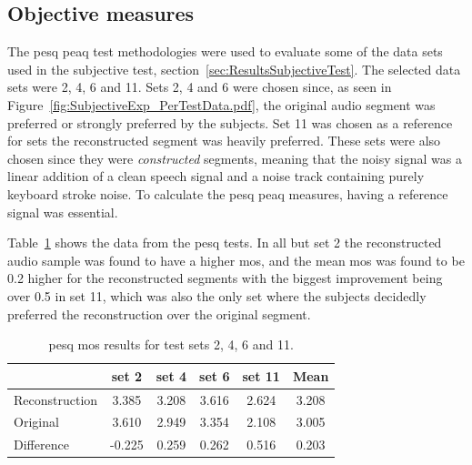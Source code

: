 \subsection{Objective measures}
The \DIFdelbegin {}\DIFdelend \DIFaddbegin \gls{pesq} \gls{peaq} \DIFaddend test methodologies were used to evaluate some of the data sets used in the subjective test, section~\ref{sec:ResultsSubjectiveTest}. The selected data sets were 2, 4, 6 and 11. Sets 2, 4 and 6 were chosen since, as seen in Figure~\ref{fig:SubjectiveExp_PerTestData.pdf}, the original audio segment was preferred or strongly preferred by the subjects. Set 11 was chosen as a reference for sets \DIFdelbegin {}\DIFdelend \DIFaddbegin {}\DIFaddend the reconstructed segment was heavily preferred. These sets were also chosen since they were \emph{constructed} segments, meaning that the noisy signal was a linear addition of a clean speech signal and a noise track containing purely keyboard stroke noise. To calculate the \DIFdelbegin {}\DIFdelend \DIFaddbegin \gls{pesq} \gls{peaq} \DIFaddend measures, having a reference signal was essential.

Table~\ref{tab:PESQdata} shows the data from the \DIFdelbegin {}\DIFdelend \DIFaddbegin \gls{pesq} \DIFaddend tests. In all but set 2 the reconstructed audio sample was found to have a higher \DIFdelbegin {}\DIFdelend \DIFaddbegin \gls{mos}\DIFaddend , and the mean \DIFdelbegin {}\DIFdelend \DIFaddbegin \gls{mos} \DIFaddend was found to be 0.2 higher for the reconstructed segments with the biggest improvement being over 0.5 in set 11, which was also the only set where the subjects decidedly preferred the reconstruction over the original segment.

\begin{table}\begin{center}
\caption{\DIFdelbeginFL {}\DIFdelendFL \DIFaddbeginFL \gls{pesq} \gls{mos} \DIFaddendFL results for test sets 2, 4, 6 and 11.}
\label{tab:PESQdata}
\begin{tabular}{|l|c|c|c|c|c|}\hline
                    & set 2 & set 4 & set 6 & set 11  & Mean \\ \hline
  Reconstruction    & 3.385 & 3.208 & 3.616 & 2.624   & 3.208 \\
  Original          & 3.610 & 2.949 & 3.354 & 2.108   & 3.005 \\ \hline
  Difference        & -0.225& 0.259 & 0.262 & 0.516   & 0.203 \\
  \hline
\end{tabular}\end{center}\end{table}

